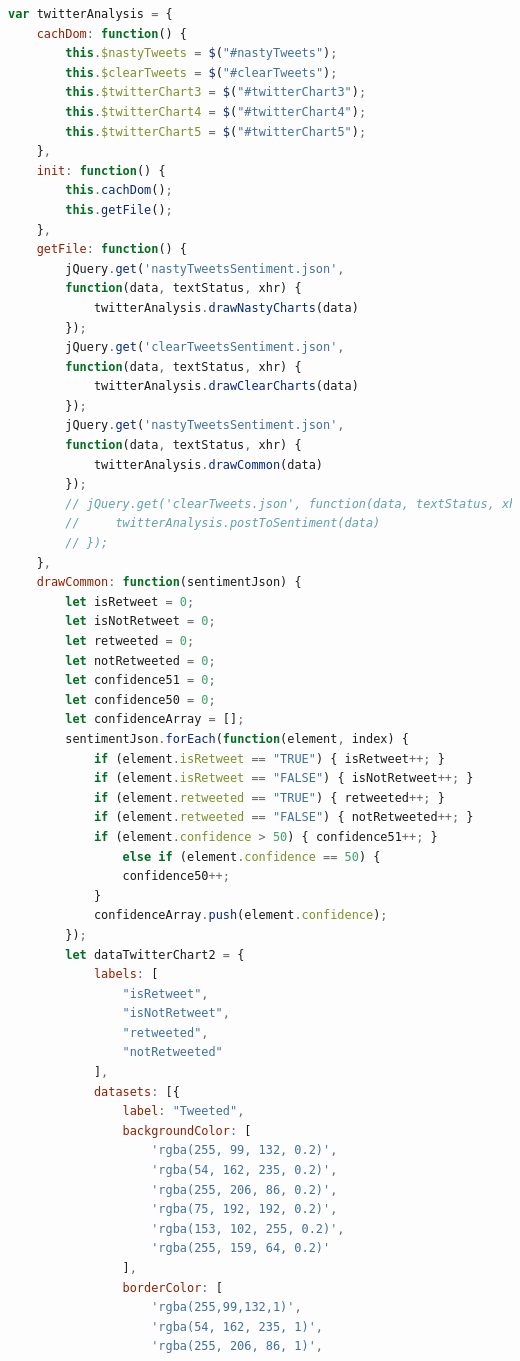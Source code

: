 \begin{lstlisting}[language=JavaScript]
var twitterAnalysis = {
    cachDom: function() {
        this.$nastyTweets = $("#nastyTweets");
        this.$clearTweets = $("#clearTweets");
        this.$twitterChart3 = $("#twitterChart3");
        this.$twitterChart4 = $("#twitterChart4");
        this.$twitterChart5 = $("#twitterChart5");
    },
    init: function() {
        this.cachDom();
        this.getFile();
    },
    getFile: function() {
        jQuery.get('nastyTweetsSentiment.json',
        function(data, textStatus, xhr) {
            twitterAnalysis.drawNastyCharts(data)
        });
        jQuery.get('clearTweetsSentiment.json',
        function(data, textStatus, xhr) {
            twitterAnalysis.drawClearCharts(data)
        });
        jQuery.get('nastyTweetsSentiment.json',
        function(data, textStatus, xhr) {
            twitterAnalysis.drawCommon(data)
        });
        // jQuery.get('clearTweets.json', function(data, textStatus, xhr) {
        //     twitterAnalysis.postToSentiment(data)
        // });
    },
    drawCommon: function(sentimentJson) {
        let isRetweet = 0;
        let isNotRetweet = 0;
        let retweeted = 0;
        let notRetweeted = 0;
        let confidence51 = 0;
        let confidence50 = 0;
        let confidenceArray = [];
        sentimentJson.forEach(function(element, index) {
            if (element.isRetweet == "TRUE") { isRetweet++; }
            if (element.isRetweet == "FALSE") { isNotRetweet++; }
            if (element.retweeted == "TRUE") { retweeted++; }
            if (element.retweeted == "FALSE") { notRetweeted++; }
            if (element.confidence > 50) { confidence51++; }
                else if (element.confidence == 50) {
                confidence50++;
            }
            confidenceArray.push(element.confidence);
        });
        let dataTwitterChart2 = {
            labels: [
                "isRetweet",
                "isNotRetweet",
                "retweeted",
                "notRetweeted"
            ],
            datasets: [{
                label: "Tweeted",
                backgroundColor: [
                    'rgba(255, 99, 132, 0.2)',
                    'rgba(54, 162, 235, 0.2)',
                    'rgba(255, 206, 86, 0.2)',
                    'rgba(75, 192, 192, 0.2)',
                    'rgba(153, 102, 255, 0.2)',
                    'rgba(255, 159, 64, 0.2)'
                ],
                borderColor: [
                    'rgba(255,99,132,1)',
                    'rgba(54, 162, 235, 1)',
                    'rgba(255, 206, 86, 1)',

\end{lstlisting}
